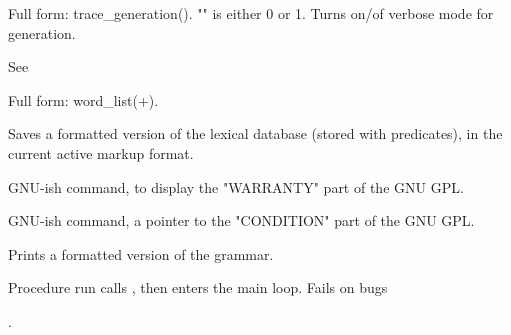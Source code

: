 \documentclass[11pt]{article}
\begin{document}
\begin{description}
Full form: trace_generation().
"" is either 0 or 1. Turns on/of verbose mode for generation.

See 

Full form: word_list(+).

Saves a formatted version of the lexical database (stored
with  predicates), in the current active markup format.

GNU-ish command, to display the "WARRANTY" part of the GNU GPL.

GNU-ish command, a pointer to the "CONDITION" part of the GNU GPL.

Prints a formatted version of the grammar.

Procedure run calls , then enters the main loop.
Fails on bugs
\end{description}

.
\printindex
\end{document}
